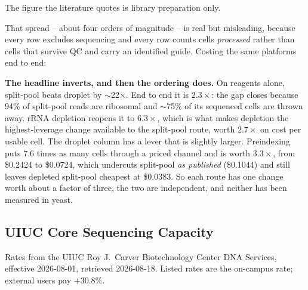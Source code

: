 The figure the literature quotes is library preparation only.



That spread -- about four orders of magnitude -- is real but misleading, because
every row excludes sequencing and every row counts cells \emph{processed} rather
than cells that survive QC and carry an identified guide. Costing the same
platforms end to end:



\begin{keybox}
\textbf{The headline inverts, and then the ordering does.} On reagents alone,
split-pool beats droplet by $\sim$22$\times$. End to end it is $2.3\times$: the
gap closes because 94\% of split-pool reads are ribosomal and $\sim$75\% of its
sequenced cells are thrown away. rRNA depletion reopens it to $6.3\times$, which
is what makes depletion the highest-leverage change available to the split-pool
route, worth $2.7\times$ on cost per usable cell. The droplet column has a lever
that is slightly larger. Preindexing puts 7.6 times as many cells through a
priced channel and is worth $3.3\times$, from \$0.2424 to \$0.0724, which
undercuts split-pool \emph{as published} (\$0.1044) and still leaves depleted
split-pool cheapest at \$0.0383. So each route has one change worth about a
factor of three, the two are independent, and neither has been measured in yeast.
\end{keybox}

\subsection{UIUC Core Sequencing Capacity}
\label{sec:sequencing}

Rates from the UIUC Roy J.\ Carver Biotechnology Center DNA Services, effective
2026-08-01, retrieved 2026-08-18. Listed rates are the on-campus rate; external
users pay $+30.8\%$.



